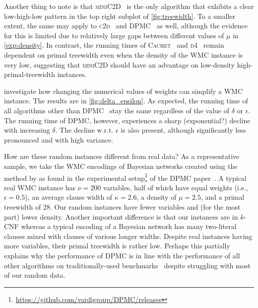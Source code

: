 \documentclass[letterpaper]{article} %
\theoremstyle{definition}
\theoremstyle{remark}
\begin{document}
Another thing to note is that \textsc{miniC2D}~\cite{DBLP:conf/ijcai/OztokD15}
is the only algorithm that exhibits a clear low-high-low pattern in the top
right subplot of \cref{fig:treewidth}. To a smaller extent, the same may apply
to \textsc{c2d}~\cite{DBLP:conf/ecai/Darwiche04} and
\textsc{DPMC}~\cite{DBLP:conf/cp/DudekPV20} as well, although the evidence for
this is limited due to relatively large gaps between different values of $\mu$
in \cref{exp:density}. In contrast, the running times of
\textsc{Cachet}~\cite{DBLP:conf/sat/SangBBKP04} and
\textsc{d4}~\cite{DBLP:conf/ijcai/LagniezM17} remain dependent on primal
treewidth even when the density of the \textsf{WMC} instance is very low,
suggesting that \textsc{miniC2D} should have an advantage on low-density
high-primal-treewidth instances.

 investigate how changing the numerical values of
weights can simplify a \textsf{WMC} instance. The results are in
\cref{fig:delta_epsilon}. As expected, the running time of all algorithms other
than \textsc{DPMC}~\cite{DBLP:conf/cp/DudekPV20} stay the same regardless of the
value of $\delta$ or $\epsilon$. The running time of \textsc{DPMC}, however,
experiences a sharp (exponential?) decline with increasing $\delta$. The decline
w.r.t. $\epsilon$ is also present, although significantly less pronounced and
with high variance.

How are these random instances different from real data? As a representative
sample, we take the \textsf{WMC} encodings of Bayesian networks created using
the method by \citeauthor{DBLP:conf/aaai/SangBK05}
 as found in the experimental
setup\footnote{\url{https://github.com/vardigroup/DPMC/releases}} of the
\textsc{DPMC} paper~\cite{DBLP:conf/cp/DudekPV20}. A typical real \textsf{WMC}
instance has $\nu = 200$ variables, half of which have equal weights (i.e.,
$\epsilon = 0.5$), an average clause width of $\kappa = 2.6$, a density of $\mu
= 2.5$, and a primal treewidth of 28. Our random instances have fewer variables
and (for the most part) lower density. Another important difference is that our
instances are in $k$-CNF whereas a typical encoding of a Bayesian network has
many two-literal clauses mixed with clauses of various longer widths. Despite
real instances having more variables, their primal treewidth is rather low.
Perhaps this partially explains why the performance of \textsc{DPMC} is in line
with the performance of all other algorithms on traditionally-used
benchmarks~\cite{DBLP:conf/cp/DudekPV20} despite struggling with most of our
random data.
\end{document}
